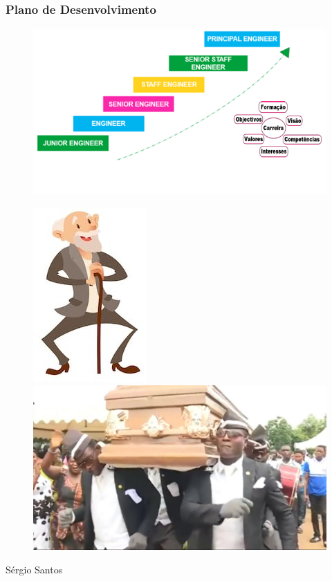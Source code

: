 \begin{frame}
\frametitle{Plano de Desenvolvimento}
\begin{minipage}{.5\linewidth}
\begin{figure}[ht]
\begin{flushleft}
\includegraphics[scale=0.35]{"./image/Career Path/Progressao.png"}
\end{flushleft}
\end{figure}
\end{minipage}
\begin{minipage}{.45\linewidth}
\begin{figure}[ht]
	\begin{flushleft}
		\includegraphics[scale=0.25]{"./image/Career Path/Old Age.jpeg"}
	\end{flushleft}\vfill
	\begin{flushright}
		\includegraphics[scale=0.1]{"./image/Career Path/Burial.jpeg"}
	\end{flushright}
\end{figure}
\end{minipage}
\vfill
\hfill {\tiny Sérgio Santos}
\end{frame}
